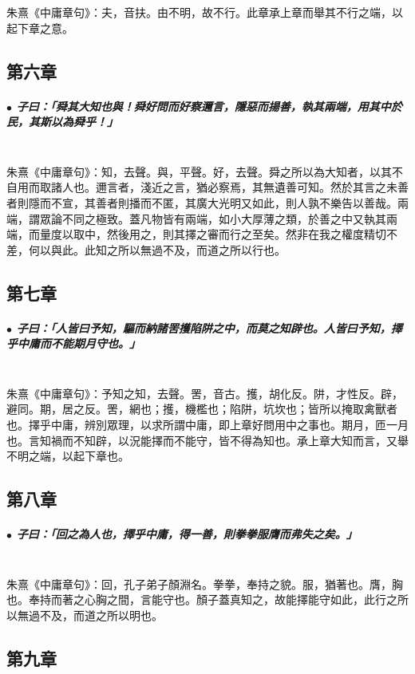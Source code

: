 \documentclass[hyperref, UTF8, 12pt, a4paper]{ctexrep}
\begin{document}
朱熹《中庸章句》：夫，音扶。由不明，故不行。此章承上章而舉其不行之端，以起下章之意。

\newpage
\subsection{第六章}

\subparagraph{$\bullet$ 子曰：「舜其大知也與！舜好問而好察邇言，隱惡而揚善，執其兩端，用其中於民，其斯以為舜乎！」} ~\\

朱熹《中庸章句》：知，去聲。與，平聲。好，去聲。舜之所以為大知者，以其不自用而取諸人也。邇言者，淺近之言，猶必察焉，其無遺善可知。然於其言之未善者則隱而不宣，其善者則播而不匿，其廣大光明又如此，則人孰不樂告以善哉。兩端，謂眾論不同之極致。蓋凡物皆有兩端，如小大厚薄之類，於善之中又執其兩端，而量度以取中，然後用之，則其擇之審而行之至矣。然非在我之權度精切不差，何以與此。此知之所以無過不及，而道之所以行也。

\newpage
\subsection{第七章}

\subparagraph{$\bullet$ 子曰：「人皆曰予知，驅而納諸罟擭陷阱之中，而莫之知辟也。人皆曰予知，擇乎中庸而不能期月守也。」} ~\\

朱熹《中庸章句》：予知之知，去聲。罟，音古。擭，胡化反。阱，才性反。辟，避同。期，居之反。罟，網也；擭，機檻也；陷阱，坑坎也；皆所以掩取禽獸者也。擇乎中庸，辨別眾理，以求所謂中庸，即上章好問用中之事也。期月，匝一月也。言知禍而不知辟，以況能擇而不能守，皆不得為知也。承上章大知而言，又舉不明之端，以起下章也。

\newpage
\subsection{第八章}

\subparagraph{$\bullet$ 子曰：「回之為人也，擇乎中庸，得一善，則拳拳服膺而弗失之矣。」} ~\\

朱熹《中庸章句》：回，孔子弟子顏淵名。拳拳，奉持之貌。服，猶著也。膺，胸也。奉持而著之心胸之間，言能守也。顏子蓋真知之，故能擇能守如此，此行之所以無過不及，而道之所以明也。

\newpage
\subsection{第九章}
\end{document}
